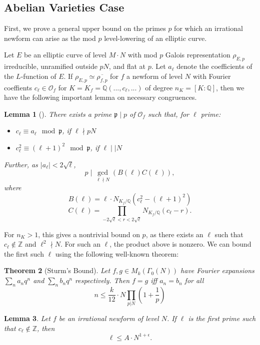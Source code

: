 \documentclass[12pt]{amsart}
\newtheorem{thm}{Theorem}[section]
\newtheorem{lem}[thm]{Lemma}
\theoremstyle{definition}
\def\O{{\mathcal O}}
\def\Q{{\mathbb Q}}
\def\Z{{\mathbb Z}}
\renewcommand{\bar}{\overline}
\begin{document}
\subsection{Abelian Varieties Case}
First, we prove a general upper bound on the primes $p$ for which an irrational newform can arise as the mod $p$ level-lowering of an elliptic curve.

Let $E$ be an elliptic curve of level $M \cdot N$ with mod $p$ Galois representation $\rho_{E,p}$ irreducible, unramified outside $pN$, and flat at $p$. Let $a_\ell$ denote the coefficients of the $L$-function of $E$.  If $\rho_{E,p} \simeq \bar{\rho_{f,p}}$ for $f$ a newform of level $N$ with Fourier coeffients $c_\ell\in \O_f$ for $K = K_f = \Q(...,c_\ell,...)$ of degree $n_K = [K:\mathbb{Q}]$, then we have the following important lemma on necessary congruences.

\begin{lem}[\cite{cohen06}]\label{ircong1}
There exists a prime $\mathfrak{p} \mid p$ of $\mathcal{O}_f$ such that, for $\ell$ prime:
\begin{itemize}
\item $c_\ell \equiv a_\ell \mod \mathfrak{p}$, if $\ell \nmid pN$
\item $c_\ell^2 \equiv (\ell+1)^2 \mod \mathfrak{p}$, if $\ell \mid\mid N$
\end{itemize}
Further, as $|a_\ell| < 2\sqrt{\ell}$,
\[p \mid \gcd_{\ell \nmid N}(B(\ell)C(\ell)), \] where
\[B(\ell) = \ell \cdot N_{K_f / \mathbb{Q}}(c_\ell^2-(\ell+1)^2) \]
\[C(\ell) = \prod_{-2\sqrt{\ell} < r < 2\sqrt{\ell}}{N_{K_f / \mathbb{Q}}}(c_\ell - r).\]
\end{lem}

For $n_K > 1$, this gives a nontrivial bound on $p$, as there exists an $\ell$ such that $c_\ell \notin \mathbb{Z}$ and $\ell^2 \nmid N$. For such an $\ell$, the product above is nonzero. We can bound the first such $\ell$ using the following well-known theorem:
\begin{thm}[Sturm's Bound]\label{sturm}
Let $f,g \in M_k(\Gamma_0(N))$ have Fourier expansions $\sum_n a_nq^n$ and $\sum_n b_n q^n$ respectively.  Then $f = g$ iff $a_n = b_n$ for all
\[ n \leq \frac{k}{12} \cdot N \prod_{p|N} \left(1 + \frac{1}{p} \right) \]
\end{thm}

\begin{lem}\label{boundell}
Let $f$ be an irrational newform of level $N$.  If $\ell$ is the first prime such that $c_\ell \not\in \Z$, then
\[ \ell \leq A \cdot N^{1+\epsilon} .\]
\end{lem}
\end{document}
